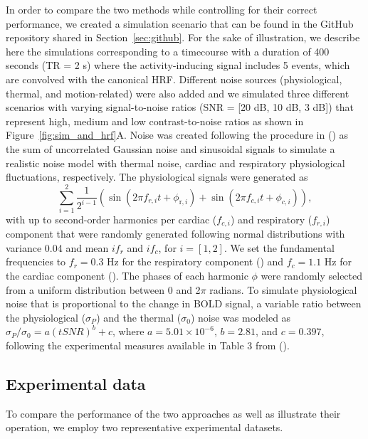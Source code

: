 In order to compare the two methods while controlling for their correct performance, we created a simulation scenario that can be found in the GitHub repository shared in Section~\ref{sec:github}. For the sake of illustration, we describe here the simulations corresponding to a timecourse with a duration of 400 seconds (TR = 2 s) where the activity-inducing signal includes 5 events, which are convolved with the canonical HRF. Different noise sources (physiological, thermal, and motion-related) were also added and we simulated three different scenarios with varying signal-to-noise ratios (SNR = [20 dB, 10 dB, 3 dB]) that represent high, medium and low contrast-to-noise ratios as shown in Figure~\ref{fig:sim_and_hrf}A. Noise was created following the procedure in (\citealt{Gaudes2013Paradigmfreemapping}) as the sum of uncorrelated Gaussian noise and sinusoidal signals to simulate a realistic noise model with thermal noise, cardiac and respiratory physiological fluctuations, respectively. The physiological signals were generated as
\begin{equation}
    \sum_{i=1}^{2} \frac{1}{2^{i-1}}\left(\sin \left(2 \pi f_{r, i} t+\phi_{\mathrm{r}, i}\right)+\sin \left(2 \pi f_{c, i} t+\phi_{c, i}\right)\right),
\end{equation}
with up to second-order harmonics per cardiac (\(f_{c,i}\)) and respiratory (\(f_{r,i}\)) component that were randomly generated following normal distributions with variance 0.04 and mean \(if_r\) and \(if_c\), for \(i = [1, 2]\). We set the fundamental frequencies to \(f_r = 0.3\) Hz for the respiratory component (\citealt{Birn2006Separatingrespiratoryvariation}) and \(f_c = 1.1\) Hz for the cardiac component (\citealt{Shmueli2007Lowfrequencyfluctuations}). The phases of each harmonic \(\phi\) were randomly selected from a uniform distribution between 0 and 2$\pi$ radians. To simulate physiological noise that is proportional to the change in BOLD signal, a variable ratio between the physiological (\(\sigma_P\)) and the thermal (\(\sigma_0\)) noise was modeled as \(\sigma_P/\sigma_0 = a(tSNR)^b + c\), where \(a = 5.01 \times 10^{-6}\), \(b = 2.81\), and \(c = 0.397\), following the experimental measures available in Table 3 from (\citealt{Triantafyllou2005Comparisonphysiologicalnoise}).

\subsection{Experimental data}
To compare the performance of the two approaches as well as illustrate their operation, we employ two representative experimental datasets.

